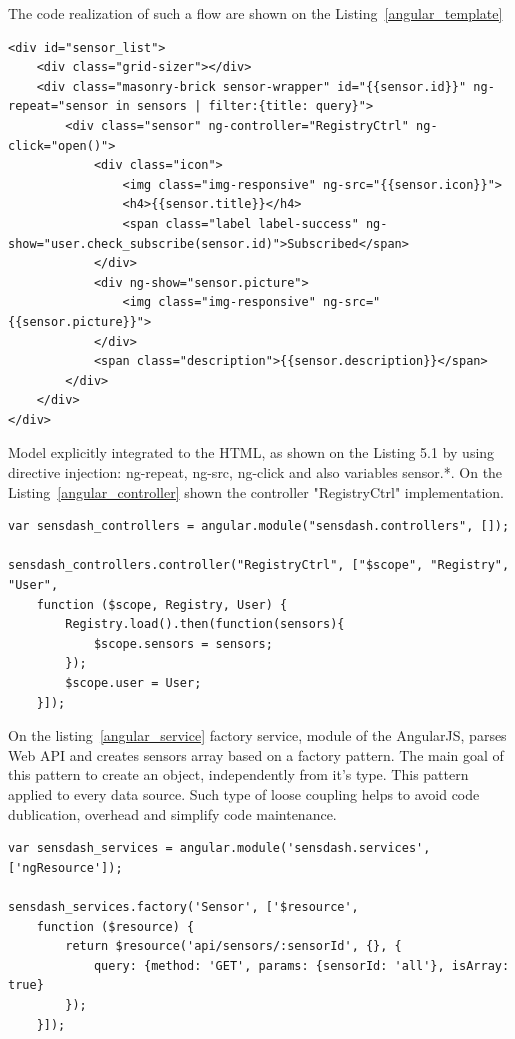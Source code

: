    The code realization of such a flow are shown on the Listing~\ref{angular_template}
    \begin{lstlisting}[label=angular_template,caption=Template registry.html]
<div id="sensor_list">
    <div class="grid-sizer"></div>
    <div class="masonry-brick sensor-wrapper" id="{{sensor.id}}" ng-repeat="sensor in sensors | filter:{title: query}">
        <div class="sensor" ng-controller="RegistryCtrl" ng-click="open()">
            <div class="icon">
                <img class="img-responsive" ng-src="{{sensor.icon}}">
                <h4>{{sensor.title}}</h4>
                <span class="label label-success" ng-show="user.check_subscribe(sensor.id)">Subscribed</span>
            </div>
            <div ng-show="sensor.picture">
                <img class="img-responsive" ng-src="{{sensor.picture}}">
            </div>
            <span class="description">{{sensor.description}}</span>
        </div>
    </div>
</div>
    \end{lstlisting}
    Model explicitly integrated to the HTML, as shown on the Listing 5.1 by using directive injection: ng-repeat, ng-src, ng-click and also variables {{sensor.*}}. On the Listing~\ref{angular_controller} shown the controller "RegistryCtrl" implementation.

    \begin{lstlisting}[label=angular_controller,caption=Controller controller.js]
var sensdash_controllers = angular.module("sensdash.controllers", []);

sensdash_controllers.controller("RegistryCtrl", ["$scope", "Registry", "User",
    function ($scope, Registry, User) {
        Registry.load().then(function(sensors){
            $scope.sensors = sensors;
        });
        $scope.user = User;
    }]);
    \end{lstlisting}

	On the listing~\ref{angular_service} factory service, module of the AngularJS, parses Web API and creates sensors array based on a factory pattern. The main goal of this pattern to create an object, independently from it's type. This pattern applied to every data source. Such type of loose coupling helps to avoid code dublication, overhead and simplify code maintenance.  

    \begin{lstlisting}[label=angular_service,caption=Controller controller.js]
var sensdash_services = angular.module('sensdash.services', ['ngResource']);

sensdash_services.factory('Sensor', ['$resource',
    function ($resource) {
        return $resource('api/sensors/:sensorId', {}, {
            query: {method: 'GET', params: {sensorId: 'all'}, isArray: true}
        });
    }]);
    \end{lstlisting}


